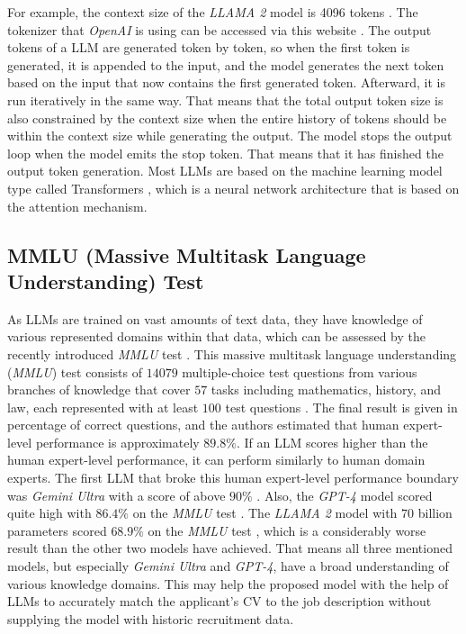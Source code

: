 \documentclass[draft,final]{thesisclass} %
\begin{document}
For example, the context size of the \textit{LLAMA 2} model is 4096 tokens \parencite[47]{llama2}.
The tokenizer that \textit{OpenAI} is using can be accessed via this website \textcite{openai_tokenizer}.
The output tokens of a \acs{LLM} are generated token by token, so when the first token is generated, it is appended to the input, and the model generates the next token based on the input that now contains the first generated token. Afterward, it is run iteratively in the same way.
That means that the total output token size is also constrained by the context size when the entire history of tokens should be within the context size while generating the output.
The model stops the output loop when the model emits the stop token. That means that it has finished the output token generation.
Most \acs{LLM}s are based on the machine learning model type called Transformers \parencite[1]{transformer}, which is a neural network architecture that is based on the attention mechanism.

\subsection{MMLU (Massive Multitask Language Understanding) Test}
As \acs{LLM}s are trained on vast amounts of text data, they have knowledge of various represented domains within that data, which can be assessed by the recently introduced \textit{MMLU} test \parencite{mmlu}.
This massive multitask language understanding (\textit{MMLU}) test consists of $14079$ multiple-choice test questions from various branches of knowledge that cover $57$ tasks including mathematics, history, and law, each represented with at least $100$ test questions \parencite[1-3]{mmlu}.
The final result is given in percentage of correct questions, and the authors estimated that human expert-level performance is approximately $89.8\%$.
If an \acs{LLM} scores higher than the human expert-level performance, it can perform similarly to human domain experts.
The first \acs{LLM} that broke this human expert-level performance boundary was \textit{Gemini Ultra} with a score of above $90\%$ \parencite[1]{gemini}.
Also, the \textit{GPT-4} model scored quite high with $86.4\%$ on the \textit{MMLU} test \parencite[32]{gpt4}.
The \textit{LLAMA 2} model with $70$ billion parameters scored $68.9\%$ on the \textit{MMLU} test \parencite[49]{llama2}, which is a considerably worse result than the other two models have achieved.
That means all three mentioned models, but especially \textit{Gemini Ultra} and \textit{GPT-4}, have a broad understanding of various knowledge domains.
This may help the proposed model with the help of \acs{LLM}s to accurately match the applicant's \acs{CV} to the job description without supplying the model with historic recruitment data.
\end{document}
